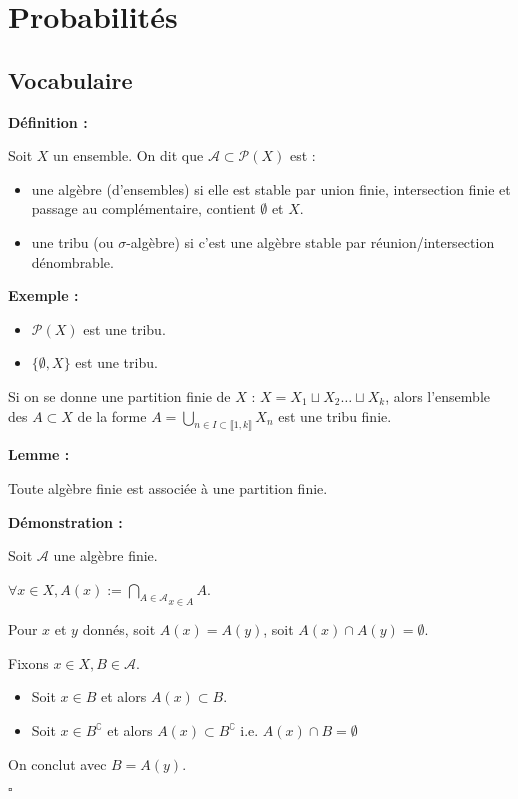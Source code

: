 \documentclass[10pt,a4paper,notitlepage ]{report}
\newcommand{\comp}[1]{#1^\complement}
\newenvironment{definition}{
	
	\textbf{Définition : }
}
{}
\newcounter{th}
\newenvironment{demo}[1][]{

	\textbf{Démonstration #1 :}
}{\begin{flushright}
	$\square$
\end{flushright}
}
\newenvironment{exemple}{
	
	\textbf{Exemple :} }{}
\newenvironment{lemme}[1][]{
	\begin{tcolorbox}
		\textbf{Lemme #1 : }
	}
	{\end{tcolorbox}}
\begin{document}
\chapter{Probabilités}
\section{Vocabulaire}

\begin{definition}
	Soit $X$ un ensemble. On dit que $\mathcal A \subset \mathcal P(X)$ est :
	\begin{itemize}
		\item une algèbre (d'ensembles) si elle est stable par union finie, intersection finie et passage au complémentaire, contient $\emptyset$ et $X$.
		\item une tribu (ou $\sigma$-algèbre) si c'est une algèbre stable par réunion/intersection dénombrable.
	\end{itemize}
\end{definition}

\begin{exemple}
	\begin{itemize}
		\item $\mathcal P(X)$ est une tribu.
		\item $\{\emptyset, X\}$ est une tribu.
	\end{itemize}
\end{exemple}

Si on se donne une partition finie de $X$ : $X=X_1 \sqcup X_2 \dots \sqcup X_k$, alors l'ensemble des $A \subset X$ de la forme $A=\underset{n\in I \subset \llbracket 1,k \rrbracket}{\bigcup}X_n$ est une tribu finie.

\begin{lemme}
	Toute algèbre finie est associée à une partition finie.
\end{lemme}

\begin{demo}
	Soit $\mathcal A$ une algèbre finie.
	
	$\forall x \in X, A(x) := \underset{x\in A}{\underset{A\in \mathcal A}{\bigcap}} A$.
	
	Pour $x$ et $y$ donnés, soit $A(x) = A(y)$, soit $A(x) \cap A(y) = \emptyset$.
	
	Fixons $x\in X, B\in\mathcal A$.
	\begin{itemize}
		\item Soit $x\in B$ et alors $A(x)\subset B$.
		\item Soit $x\in \comp B$ et alors $A(x)\subset \comp B$ i.e. $A(x)\cap B = \emptyset$
	\end{itemize}
	On conclut avec $B=A(y)$.
\end{demo}
\end{document}
